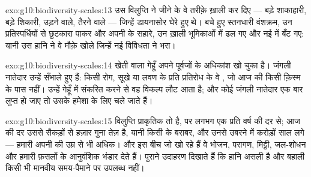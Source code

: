 \begin{solution}{exo:g10:biodiversity-scales:13}
उस विलुप्ति ने जीने के वे तरीक़े ख़ाली कर दिए --- बड़े शाकाहारी, बड़े
शिकारी, उड़ने वाले, तैरने वाले --- जिन्हें डायनासोर घेरे हुए थे। बचे हुए
स्तनधारी वंशक्रम, उन प्रतिस्पर्धियों से छुटकारा पाकर और अपनी  के सहारे, उन ख़ाली भूमिकाओं में ढल गए और नई  में बँट
गए: यानी उस हानि ने वे मौक़े खोले जिन्हें नई विविधता ने भरा।
\end{solution}

\begin{solution}{exo:g10:biodiversity-scales:14}
खेती वाला गेहूँ अपने पूर्वजों के अधिकांश  खो चुका है। जंगली
नातेदार उन्हें सँभाले हुए हैं: किसी रोग, सूखे या लवण के प्रति प्रतिरोध के
वे , जो आज की किसी क़िस्म के पास नहीं। उन्हें गेहूँ में संकरित
करने से वह विकल्प लौट आता है; और कोई जंगली नातेदार एक बार लुप्त हो जाए तो
उसके  हमेशा के लिए चले जाते हैं।
\end{solution}

\begin{solution}{exo:g10:biodiversity-scales:15}
विलुप्ति प्राकृतिक तो है, पर लगभग एक  प्रति वर्ष की दर से; आज की
दर उससे सैकड़ों से हज़ार गुना तेज़ है, यानी किसी  के
बराबर, और उनसे उबरने में करोड़ों साल लगे --- हमारी अपनी  की उम्र
से भी अधिक। और इस बीच जो  खो रहे हैं वे भोजन, परागण, मिट्टी,
जल-शोधन और हमारी फ़सलों के आनुवंशिक भंडार देते हैं। पुराने उदाहरण दिखाते
हैं कि हानि असली है और बहाली किसी भी मानवीय समय-पैमाने पर उपलब्ध नहीं।
\end{solution}

